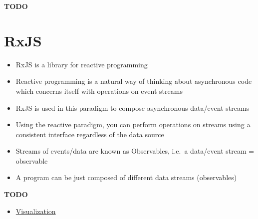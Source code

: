 \documentclass[12pt,]{article}
\providecommand{\tightlist}{%
  \setlength{\itemsep}{0pt}\setlength{\parskip}{0pt}}
\begin{document}
\textbf{TODO}

\section{RxJS}\label{rxjs}

\begin{itemize}
\tightlist
\item
  RxJS is a library for reactive programming
\item
  Reactive programming is a natural way of thinking about asynchronous
  code which concerns itself with operations on event streams
\item
  RxJS is used in this paradigm to compose asynchronous data/event
  streams
\item
  Using the reactive paradigm, you can perform operations on streams
  using a consistent interface regardless of the data source
\item
  Streams of events/data are known as Observables, i.e.~a data/event
  stream = observable
\item
  A program can be just composed of different data streams (observables)
\end{itemize}

\textbf{TODO}

\begin{itemize}
\tightlist
\item
  \href{http://rxmarbles.com/}{Visualization}
\end{itemize}
\end{document}
